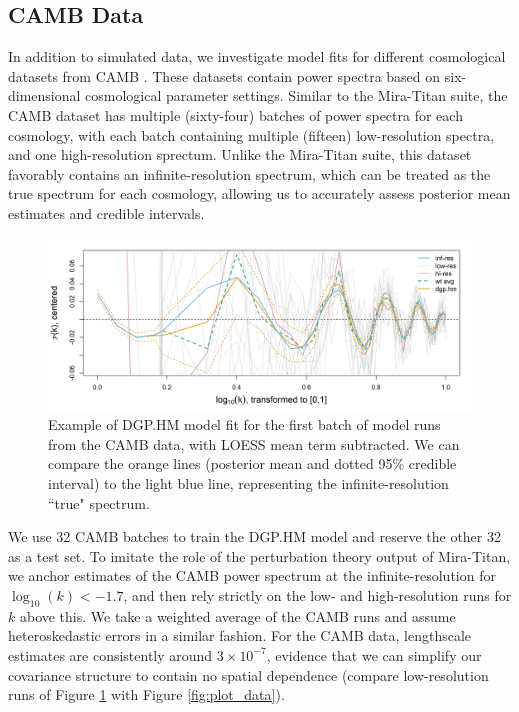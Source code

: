 \documentclass[11pt]{article}
\begin{document}
\subsection{CAMB Data}
\label{subsec:camb}

In addition to simulated data, we investigate model fits for different cosmological 
datasets from CAMB \citep{lewis2011CAMB}. These datasets contain power spectra based
on six-dimensional cosmological parameter settings. Similar to the Mira-Titan suite, the
CAMB dataset has multiple (sixty-four) batches of power spectra for each cosmology, with each batch 
containing multiple (fifteen) low-resolution spectra, and one high-resolution sprectum. 
Unlike the Mira-Titan suite, this dataset favorably contains an infinite-resolution 
spectrum, which can be treated as the true spectrum for each cosmology,
allowing us to accurately assess posterior mean estimates and credible intervals. 

\begin{figure}
    \centering
    \includegraphics[width=\textwidth]{CAMB_fit_model1.png}
    \caption{Example of DGP.HM model fit for the first batch of model runs from the CAMB data, 
             with LOESS mean term subtracted. We can compare the orange lines 
             (posterior mean and dotted 95\% credible interval) to the light blue line,
             representing the infinite-resolution ``true" spectrum.}   
    \label{fig:fit_camb}
\end{figure}

We use 32 CAMB batches to train the DGP.HM model and reserve the other 32 as a test set.
To imitate the role of the perturbation theory output of Mira-Titan, we anchor estimates of the CAMB
power spectrum at the infinite-resolution for $\log_{10}(k) < -1.7$, and then rely 
strictly on the low- and high-resolution runs for $k$ above this. We take a weighted
average of the CAMB runs and assume heteroskedastic errors in a similar fashion. For the CAMB
data, lengthscale estimates are consistently around $3\times 10^{-7}$, evidence that we
can simplify our covariance structure to contain no spatial dependence 
(compare low-resolution runs of Figure \ref{fig:fit_camb} 
with Figure \ref{fig:plot_data}).
\end{document}
